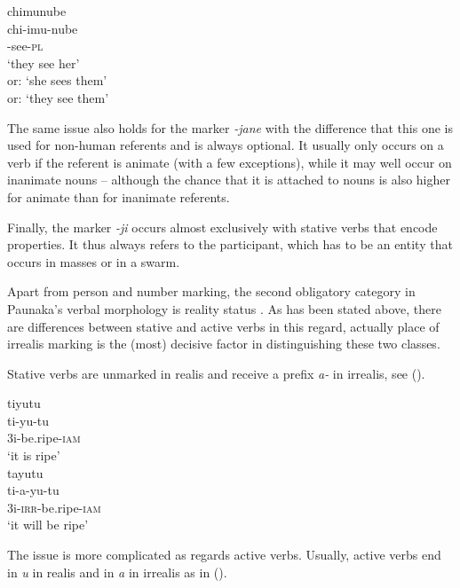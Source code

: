 \ea\label{ex:Sketch-3PLAMB}
\begingl
\glpreamble chimunube\\
\gla chi-imu-nube\\
-see-\textsc{pl}\\
\glft ‘they see her’\\or: ‘she sees them’\\or: ‘they see them’\\
\endgl
\xe
{}

The same issue also holds for the  marker \textit{-jane} with the difference that this one is used for non-human referents and is always optional. It usually only occurs on a verb if the referent is animate (with a few exceptions), while it may well occur on inanimate nouns – although the chance that it is attached to nouns is also higher for animate than for inanimate referents.

Finally, the  marker \textit{-ji} occurs almost exclusively with stative verbs that encode properties. It thus always refers to the  participant, which has to be an entity that occurs in masses or in a swarm.

Apart from person and number marking, the second obligatory category in Paunaka’s verbal morphology is reality status . As has been stated above, there are differences between stative and active verbs in this regard, actually place of irrealis marking is the (most) decisive factor in distinguishing these two classes.

Stative verbs are unmarked in realis and receive a prefix \textit{a-} in irrealis, see ().

\ea\label{ex:Sketch-StatRS}
  \ea
\begingl
\glpreamble tiyutu\\
\gla ti-yu-tu\\
\glb 3i-be.ripe-\textsc{iam}\\
\glft ‘it is ripe’\\
\endgl
  \ex
\begingl
\glpreamble tayutu\\
\gla ti-a-yu-tu\\
\glb 3i-\textsc{irr}-be.ripe-\textsc{iam}\\
\glft ‘it will be ripe’\\
\endgl
\z
\xe{}

The issue is more complicated as regards active verbs. Usually, active verbs end in \textit{u} in realis and in \textit{a} in irrealis as in ().


